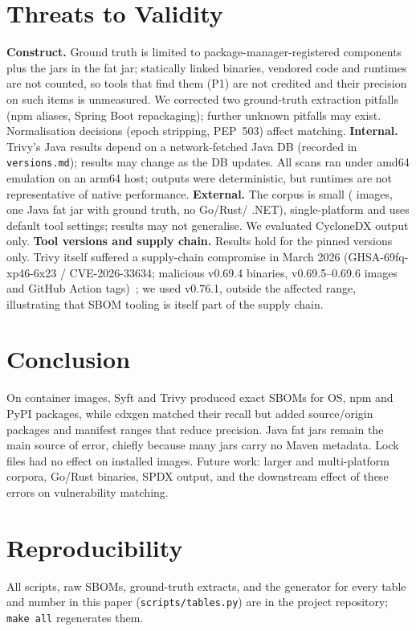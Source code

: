 \documentclass[conference]{IEEEtran}
\newcommand{\syft}{Syft\xspace}
\newcommand{\trivy}{Trivy\xspace}
\newcommand{\cdxgen}{cdxgen\xspace}
\begin{document}
\section{Threats to Validity}
\textbf{Construct.} Ground truth is limited to package-manager-registered components plus the jars in
the fat jar; statically linked binaries, vendored code and runtimes are not counted, so tools that find
them (P1) are not credited and their precision on such items is unmeasured. We corrected two
ground-truth extraction pitfalls (npm aliases, Spring Boot repackaging); further unknown pitfalls may
exist. Normalisation decisions (epoch stripping, PEP~503) affect matching.
\textbf{Internal.} \trivy's Java results depend on a network-fetched Java DB (recorded in
\texttt{versions.md}); results may change as the DB updates. All scans ran under amd64 emulation on an
arm64 host; outputs were deterministic, but runtimes are not representative of native performance.
\textbf{External.} The corpus is small (\NImages{} images, one Java fat jar with ground truth, no Go/Rust/
.NET), single-platform and uses default tool settings; results may not generalise. We evaluated
CycloneDX output only.
\textbf{Tool versions and supply chain.} Results hold for the pinned versions only. \trivy itself suffered
a supply-chain compromise in March 2026 (GHSA-69fq-xp46-6x23 / CVE-2026-33634; malicious v0.69.4
binaries, v0.69.5--0.69.6 images and GitHub Action tags)~\cite{trivyadvisory}; we used v0.76.1, outside
the affected range, illustrating that SBOM tooling is itself part of the supply chain.

\section{Conclusion}
On \NImages{} container images, \syft and \trivy produced exact SBOMs for OS, npm and PyPI packages,
while \cdxgen matched their recall but added source/origin packages and manifest ranges that reduce
precision. Java fat jars remain the main source of error, chiefly because many jars carry no Maven
metadata. Lock files had no effect on installed images. Future work: larger and multi-platform corpora,
Go/Rust binaries, SPDX output, and the downstream effect of these errors on vulnerability matching.

\section*{Reproducibility}
All scripts, raw SBOMs, ground-truth extracts, and the generator for every table and number in this
paper (\texttt{scripts/tables.py}) are in the project repository; \texttt{make all} regenerates them.



\end{document}
